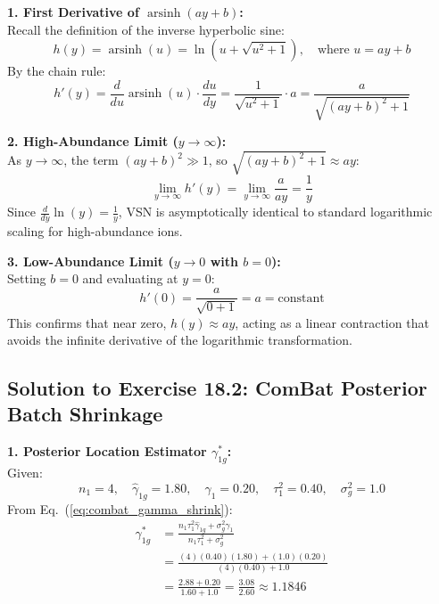 \documentclass[11pt,oneside]{book}
\begin{document}
\textbf{1. First Derivative of $\operatorname{arsinh}(ay + b)$:}\\
Recall the definition of the inverse hyperbolic sine:
\begin{equation}
h(y) = \operatorname{arsinh}(u) = \ln(u + \sqrt{u^2 + 1}), \quad \text{where } u = ay + b
\end{equation}
By the chain rule:
\begin{equation}
h'(y) = \frac{d}{du}\operatorname{arsinh}(u) \cdot \frac{du}{dy} = \frac{1}{\sqrt{u^2 + 1}} \cdot a = \frac{a}{\sqrt{(ay + b)^2 + 1}}
\end{equation}

\textbf{2. High-Abundance Limit ($y \to \infty$):}\\
As $y \to \infty$, the term $(ay + b)^2 \gg 1$, so $\sqrt{(ay + b)^2 + 1} \approx ay$:
\begin{equation}
\lim_{y \to \infty} h'(y) = \lim_{y \to \infty} \frac{a}{ay} = \frac{1}{y}
\end{equation}
Since $\frac{d}{dy}\ln(y) = \frac{1}{y}$, VSN is asymptotically identical to standard logarithmic scaling for high-abundance ions.

\textbf{3. Low-Abundance Limit ($y \to 0$ with $b = 0$):}\\
Setting $b = 0$ and evaluating at $y = 0$:
\begin{equation}
h'(0) = \frac{a}{\sqrt{0 + 1}} = a = \text{constant}
\end{equation}
This confirms that near zero, $h(y) \approx ay$, acting as a linear contraction that avoids the infinite derivative of the logarithmic transformation.

\subsection*{Solution to Exercise 18.2: ComBat Posterior Batch Shrinkage}

\textbf{1. Posterior Location Estimator $\gamma_{1g}^*$:}\\
Given:
$$n_1 = 4, \quad \hat{\gamma}_{1g} = 1.80, \quad \gamma_1 = 0.20, \quad \tau_1^2 = 0.40, \quad \sigma_g^2 = 1.0$$
From Eq.~(\ref{eq:combat_gamma_shrink}):
\begin{align*}
\gamma_{1g}^* &= \frac{n_1 \tau_1^2 \hat{\gamma}_{1g} + \sigma_g^2 \gamma_1}{n_1 \tau_1^2 + \sigma_g^2} \\
&= \frac{(4)(0.40)(1.80) + (1.0)(0.20)}{(4)(0.40) + 1.0} \\
&= \frac{2.88 + 0.20}{1.60 + 1.0} = \frac{3.08}{2.60} \approx 1.1846
\end{align*}
\end{document}
